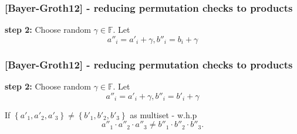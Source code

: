 \documentclass[shadesubsections,trans,14pt,mathserif]{beamer}
\newcommand{\F}{\ensuremath{\mathbb F}}
\newcommand{\set}[1]{\ensuremath{\left\{#1\right\}}}
\begin{document}
\begin{frame}
\frametitle{{\normalsize{[Bayer-Groth12]}} - reducing permutation checks to products}   %

\textbf{step 2:} Choose random $\gamma\in \F$. Let
 \[a''_i=a'_i +\gamma, b''_i = b_i + \gamma\]
 
 
 \vspace{0.2in}


\end{frame}
\begin{frame}
\frametitle{{\normalsize{[Bayer-Groth12]}} - reducing permutation checks to products}   %

\textbf{step 2:} Choose random $\gamma\in \F$. Let
 \[a''_i=a'_i +\gamma, b''_i = b'_i + \gamma\]
 
 
 \vspace{0.2in}

If $\set{a'_1,a'_2,a'_3}\neq \set{b'_1,b'_2,b'_3}$ as multiset - w.h.p  \[a''_1\cdot a''_2\cdot a''_3 \neq b''_1\cdot b''_2\cdot b''_3.\]  

\end{frame}

% 
\end{document}
